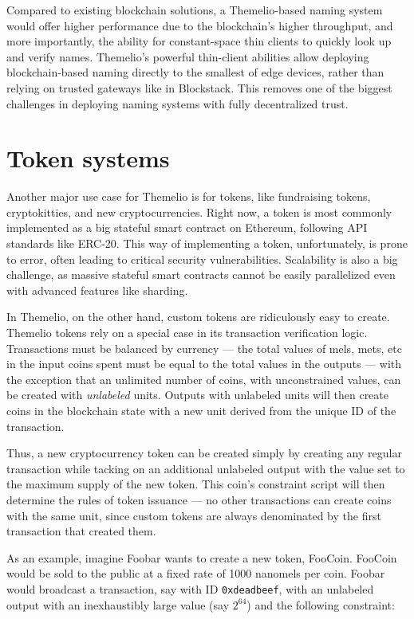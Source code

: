 \documentclass[headinclude]{scrbook}
\begin{document}
Compared to existing blockchain solutions, a Themelio-based naming system would offer higher performance due to the blockchain's higher throughput, and more importantly, the ability for constant-space thin clients to quickly look up and verify names. Themelio's powerful thin-client abilities allow deploying blockchain-based naming directly to the smallest of edge devices, rather than relying on trusted gateways like in Blockstack. This removes one of the biggest challenges in deploying naming systems with fully decentralized trust.

\section{Token systems}

Another major use case for Themelio is for tokens, like fundraising tokens, cryptokitties, and new cryptocurrencies. Right now, a token is most commonly implemented as a big stateful smart contract on Ethereum, following API standards like ERC-20. This way of implementing a token, unfortunately, is prone to error, often leading to critical security vulnerabilities. Scalability is also a big challenge, as massive stateful smart contracts cannot be easily parallelized even with advanced features like sharding.

In Themelio, on the other hand, custom tokens are ridiculously easy to create. Themelio tokens rely on a special case in its transaction verification logic. Transactions must be balanced by currency --- the total values of mels, mets, etc in the input coins spent must be equal to the total values in the outputs --- with the exception that an unlimited number of coins, with unconstrained values, can be created with \textit{unlabeled} units. Outputs with unlabeled units will then create coins in the blockchain state with a new unit derived from the unique ID of the transaction.

Thus, a new cryptocurrency token can be created simply by creating any regular transaction while tacking on an additional unlabeled output with the value set to the maximum supply of the new token. This coin's constraint script will then determine the rules of token issuance --- no other transactions can create coins with the same unit, since custom tokens are always denominated by the first transaction that created them.

As an example, imagine Foobar wants to create a new token, FooCoin. FooCoin would be sold to the public at a fixed rate of 1000 nanomels per coin. Foobar would broadcast a transaction, say with ID \texttt{0xdeadbeef}, with an unlabeled output with an inexhaustibly large value (say $2^{64}$) and the following constraint:
\end{document}
